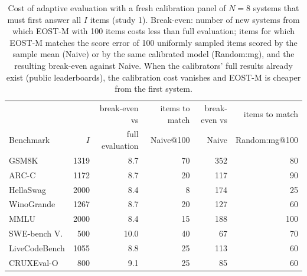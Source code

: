 \begin{table}[tbp]
\centering\footnotesize
\caption{Cost of adaptive evaluation with a fresh calibration panel of $N=8$ systems that must first answer all $I$ items (study 1). Break-even: number of new systems from which EOST-M with 100 items costs less than full evaluation; items for which EOST-M matches the score error of 100 uniformly sampled items scored by the sample mean (Naive) or by the same calibrated model (Random:mg), and the resulting break-even against Naive. When the calibrators' full results already exist (public leaderboards), the calibration cost vanishes and EOST-M is cheaper from the first system.}
\label{tab:cost}
\begin{tabular}{@{}lrrrrr@{}}
\toprule
 & & break-even vs & items to match & break-even vs & items to match \\
Benchmark & $I$ & full evaluation & Naive@100 & Naive & Random:mg@100 \\
\midrule
GSM8K & 1319 & 8.7 & 70 & 352 & 80 \\
ARC-C & 1172 & 8.7 & 20 & 117 & 90 \\
HellaSwag & 2000 & 8.4 & 8 & 174 & 25 \\
WinoGrande & 1267 & 8.7 & 20 & 127 & 60 \\
MMLU & 2000 & 8.4 & 15 & 188 & 100 \\
SWE-bench V. & 500 & 10.0 & 40 & 67 & 70 \\
LiveCodeBench & 1055 & 8.8 & 25 & 113 & 60 \\
CRUXEval-O & 800 & 9.1 & 25 & 85 & 60 \\
\bottomrule
\end{tabular}
\end{table}

